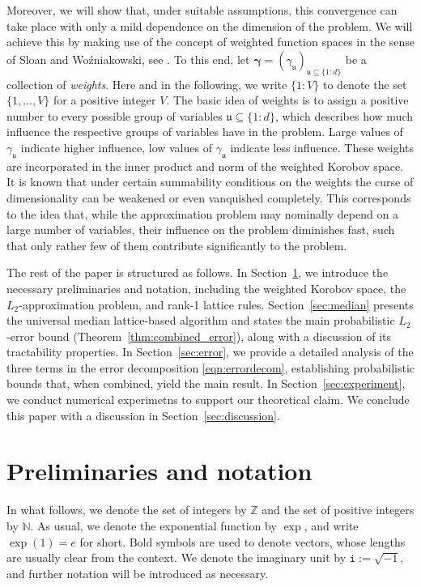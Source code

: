 \documentclass[a4paper,11pt]{article}
\newcommand{\bsgamma}{\boldsymbol{\gamma}}
\newcommand{\NN}{\mathbb{N}}
\newcommand{\ZZ}{\mathbb{Z}}
\newcommand{\fraku}{\mathfrak{u}}
\newcommand{\icomp}{\mathtt{i}}
\begin{document}
Moreover, we will show that, under suitable assumptions, this convergence can take place with only a mild dependence on the dimension of the problem. We will achieve this by making use of the concept of weighted function spaces in the sense of Sloan and Wo\'{z}niakowski, see \cite{sloan1998when}. To this end, let $\bsgamma=(\gamma_{\fraku})_{\fraku\subseteq \{1{:}d\}}$ be a collection of \textit{weights}. Here and in the following, we write $\{1{:}V\}$ to denote the set $\{1,\ldots, V\}$ for a positive integer $V$. The basic idea of weights is to assign a positive number to every possible group of variables $\fraku\subseteq \{1{:}d\}$, which describes how much influence the
respective groups of variables have in the problem. Large values of $\gamma_{\fraku}$ indicate higher influence, low values of $\gamma_{\fraku}$ indicate less influence. These weights are incorporated in the inner product and norm of the weighted Korobov space. It is known that under certain summability conditions on the weights the curse of dimensionality can be weakened or even vanquished completely. This corresponds to the idea that, while the approximation problem may nominally depend on a large number of variables, their influence on the problem diminishes fast, such that only rather few of them contribute significantly to the problem. 

The rest of the paper is structured as follows.
In Section~\ref{sec:preliminaries}, we introduce the necessary preliminaries and notation, including the weighted Korobov space, the $L_2$-approximation problem, and rank-1 lattice rules.
Section~\ref{sec:median} presents the universal median lattice-based algorithm and states the main probabilistic $L_2$-error bound (Theorem~\ref{thm:combined_error}), along with a discussion of its tractability properties.
In Section~\ref{sec:error}, we provide a detailed analysis of the three terms in the error decomposition \eqref{eqn:errordecom}, establishing probabilistic bounds that, when combined, yield the main result.
In Section~\ref{sec:experiment}, we conduct numerical experimetns to support our theoretical claim.
We conclude this paper with a discussion in Section~\ref{sec:discussion}.


\section{Preliminaries and notation}\label{sec:preliminaries}

In what follows, we denote the set of integers by $\ZZ$ and the set of positive integers by $\NN$. As usual, we denote the exponential function by $\exp$, and write $\exp(1)=e$ for short. Bold symbols are used to denote vectors, whose lengths are usually clear from the context. We denote the imaginary unit by $\icomp := \sqrt{-1}$, and further notation will be introduced as necessary.
\end{document}
